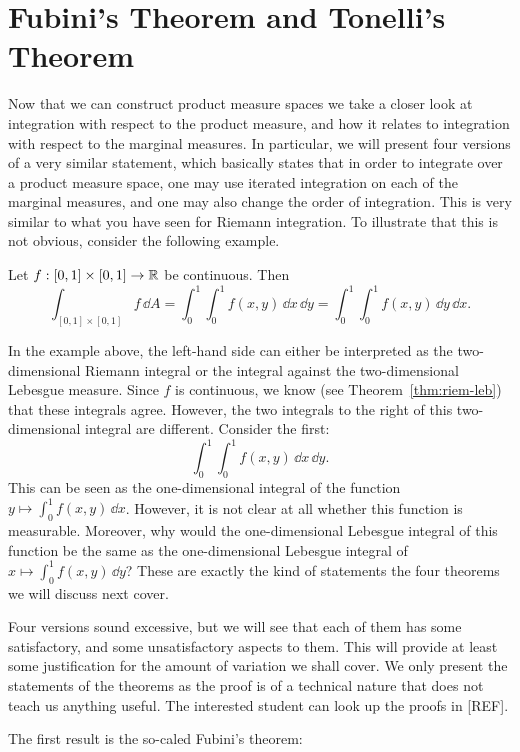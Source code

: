 \section{Fubini's Theorem and Tonelli's Theorem}

Now that we can construct product measure spaces we take a closer look at integration with respect to the product measure, and how it relates to integration with respect to the marginal measures. In particular, we will present four versions of a very similar statement, which basically states that in order to integrate over a product measure space, one may use iterated integration on each of the marginal measures, and one may also change the order of integration. This is very similar to what you have seen for Riemann integration. To illustrate that this is not obvious, consider the following example.

\begin{example}
	Let $f: [0,1]\times[0,1] \to \mathbb R$ be continuous. Then  
	\[
	\int_{[0,1]\times[0,1]} f\, \dd A = \int_0^1\!\! \int_0^1 f(x,y)\, \dd x\, \dd y = \int_0^1\!\! \int_0^1 f(x,y)\, \dd y \,\dd x.
	\]	
\end{example}

In the example above, the left-hand side can either be interpreted as the two-dimensional Riemann integral or the integral against the two-dimensional Lebesgue measure. Since $f$ is continuous, we know (see Theorem~\ref{thm:riem-leb}) that these integrals agree. However, the two integrals to the right of this two-dimensional integral are different. Consider the first:
\[
	\int_0^1\!\! \int_0^1 f(x,y)\, \dd x\, \dd y.
\]
This can be seen as the one-dimensional integral of the function $y \mapsto \int_0^1 f(x,y)\, \dd x$. However, it is not clear at all whether this function is measurable. Moreover, why would the one-dimensional Lebesgue integral of this function be the same as the one-dimensional Lebesgue integral of $x \mapsto \int_0^1 f(x,y)\, \dd y$? These are exactly the kind of statements the four theorems we will discuss next cover.

Four versions sound excessive, but we will see that each of them has some satisfactory, and some unsatisfactory aspects to them. This will provide at least some justification for the amount of variation we shall cover. We only present the statements of the theorems as the proof is of a technical nature that does not teach us anything useful. The interested student can look up the proofs in [REF].

The first result is the so-caled Fubini's theorem:

